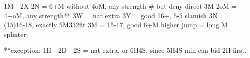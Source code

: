 1M - 2X
2N = 6+M without 4oM, any strength  # but deny direct 3M
2oM = 4+oM, any strength**
3W = nat extra
3Y = good 16+, 5-5 slamish
3N = (15)16-18, exactly 5M332fit
3M = 15-17, good 6+M
higher jump = long M splinter

**exception: 1H - 2D - 2S = nat extra, or 6H4S, since 5H4S min can bid 2H first.